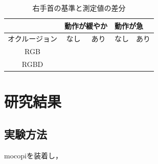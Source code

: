 \documentclass[titlepage]{jarticle}
\begin{document}
\begin{table}[b!]
  \centering
  \caption{右手首の基準と測定値の差分}
  \begin{tabular}{c||c|c|c|c}
            & \multicolumn{2}{l}{動作が緩やか} & \multicolumn{2}{l}{動作が急}           \\\hline
    オクルージョン & なし                         & あり                       & なし & あり \\\hline\hline
    RGB     &                            &                          &    &    \\
    RGBD    &                            &                          &    &    \\\hline
  \end{tabular}
  \label{righthand}
\end{table}
%
%
%
%
%

%
%
%
%
\section{研究結果}
%



%
%
\subsection{実験方法}
%
mocopiを装着し，
%
%
%
\end{document}
